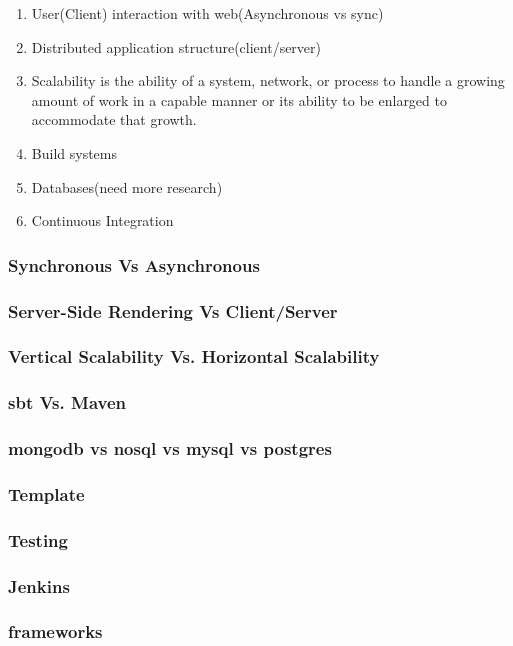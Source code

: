 \begin{enumerate}
	\item User(Client) interaction with web(Asynchronous vs sync)
	\item Distributed application structure(client/server)
	\item Scalability is the ability of a system, network, or process to handle a growing amount of work in a capable manner or its ability to be enlarged to accommodate that growth.
	\item Build systems
	\item Databases(need more research)
	\item Continuous Integration
\end{enumerate}
\subsubsection{Synchronous Vs Asynchronous}
\subsubsection{Server-Side Rendering Vs Client/Server}
\subsubsection{Vertical Scalability Vs. Horizontal Scalability}
\subsubsection{sbt Vs. Maven}
\subsubsection{mongodb vs nosql vs mysql vs postgres}
\subsubsection{Template}
\subsubsection{Testing}
\subsubsection{Jenkins}
\subsubsection{frameworks}


